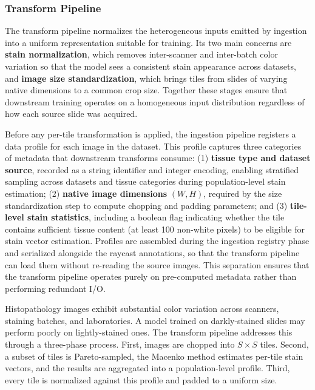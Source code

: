 \subsubsection{Transform Pipeline}

The transform pipeline normalizes the heterogeneous inputs emitted by ingestion into a uniform representation suitable for training. Its two main concerns are \textbf{stain normalization}, which removes inter-scanner and inter-batch color variation so that the model sees a consistent stain appearance across datasets, and \textbf{image size standardization}, which brings tiles from slides of varying native dimensions to a common crop size. Together these stages ensure that downstream training operates on a homogeneous input distribution regardless of how each source slide was acquired.

Before any per-tile transformation is applied, the ingestion pipeline registers a data profile for each image in the dataset. This profile captures three categories of metadata that downstream transforms consume: (1) \textbf{tissue type and dataset source}, recorded as a string identifier and integer encoding, enabling stratified sampling across datasets and tissue categories during population-level stain estimation; (2) \textbf{native image dimensions} $(W, H)$, required by the size standardization step to compute chopping and padding parameters; and (3) \textbf{tile-level stain statistics}, including a boolean flag indicating whether the tile contains sufficient tissue content (at least 100 non-white pixels) to be eligible for stain vector estimation. Profiles are assembled during the ingestion registry phase and serialized alongside the raycast annotations, so that the transform pipeline can load them without re-reading the source images. This separation ensures that the transform pipeline operates purely on pre-computed metadata rather than performing redundant I/O.


Histopathology images exhibit substantial color variation across scanners, staining batches, and laboratories. A model trained on darkly-stained slides may perform poorly on lightly-stained ones. The transform pipeline addresses this through a three-phase process. First, images are chopped into $S \times S$ tiles. Second, a subset of tiles is Pareto-sampled, the Macenko method \cite{macenko2009} estimates per-tile stain vectors, and the results are aggregated into a population-level profile. Third, every tile is normalized against this profile and padded to a uniform size.

